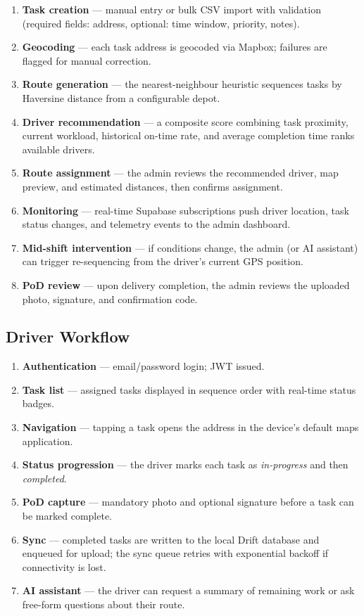 \begin{enumerate}
  \item \textbf{Task creation} — manual entry or bulk CSV import with
        validation (required fields: address, optional: time window, priority,
        notes).
  \item \textbf{Geocoding} — each task address is geocoded via Mapbox; failures
        are flagged for manual correction.
  \item \textbf{Route generation} — the nearest-neighbour heuristic sequences
        tasks by Haversine distance from a configurable depot.
  \item \textbf{Driver recommendation} — a composite score combining task
        proximity, current workload, historical on-time rate, and average
        completion time ranks available drivers.
  \item \textbf{Route assignment} — the admin reviews the recommended driver,
        map preview, and estimated distances, then confirms assignment.
  \item \textbf{Monitoring} — real-time Supabase subscriptions push driver
        location, task status changes, and telemetry events to the admin
        dashboard.
  \item \textbf{Mid-shift intervention} — if conditions change, the admin (or
        AI assistant) can trigger re-sequencing from the driver's current GPS
        position.
  \item \textbf{PoD review} — upon delivery completion, the admin reviews the
        uploaded photo, signature, and confirmation code.
\end{enumerate}

\subsection{Driver Workflow}
\label{sec:driver-flow}

\begin{enumerate}
  \item \textbf{Authentication} — email/password login; JWT issued.
  \item \textbf{Task list} — assigned tasks displayed in sequence order with
        real-time status badges.
  \item \textbf{Navigation} — tapping a task opens the address in the device's
        default maps application.
  \item \textbf{Status progression} — the driver marks each task as
        \emph{in-progress} and then \emph{completed}.
  \item \textbf{PoD capture} — mandatory photo and optional signature before
        a task can be marked complete.
  \item \textbf{Sync} — completed tasks are written to the local Drift
        database and enqueued for upload; the sync queue retries with
        exponential backoff if connectivity is lost.
  \item \textbf{AI assistant} — the driver can request a summary of remaining
        work or ask free-form questions about their route.
\end{enumerate}

